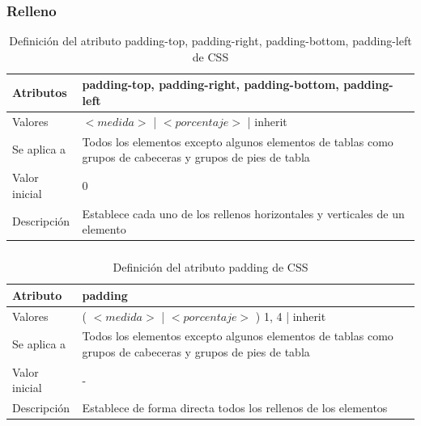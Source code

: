 \documentclass[ucs]{beamer}
\begin{document}

\begin{frame}
\frametitle{Relleno}

\begin{center}
  \begin{table}
   \begin{tabular}{p{1.8cm}p{7.8cm}}
Atributos &\bf{padding-top}, \bf{padding-right}, \bf{padding-bottom}, \bf{padding-left} \\ \hline
Valores & $<medida>$ | $<porcentaje>$ | inherit \\ \hline
Se aplica a & Todos los elementos excepto algunos elementos de tablas como grupos de cabeceras y grupos de pies de tabla \\ \hline
Valor inicial & 0 \\ \hline
Descripción & Establece cada uno de los rellenos horizontales y verticales de un elemento \\ \hline
  \end{tabular}
   \caption{Definición del atributo padding-top, padding-right, padding-bottom, padding-left de CSS}
 \end{table}
\end{center}

\end{frame}


\begin{frame}
\frametitle{}

\begin{center}
  \begin{table}
   \begin{tabular}{p{1.8cm}p{7.8cm}}
Atributo &\bf{padding} \\ \hline
Valores & ( $<medida>$ | $<porcentaje>$ ) {1, 4} | inherit \\ \hline
Se aplica a & Todos los elementos excepto algunos elementos de tablas como grupos de cabeceras y grupos de pies de tabla \\ \hline
Valor inicial & - \\ \hline
Descripción & Establece de forma directa todos los rellenos de los elementos \\ \hline
  \end{tabular}
   \caption{Definición del atributo padding de CSS}
 \end{table}
\end{center}

\end{frame}
\end{document}
